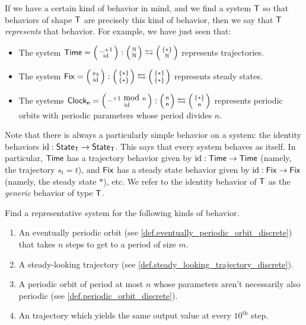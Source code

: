 \documentclass[DynamicalBook]{subfiles}
\begin{document}
If we have a certain kind of behavior in mind, and we find a system $\mathsf{T}$ so
that behaviors of shape $\mathsf{T}$ are precisely this kind of behavior, then we
say that $\mathsf{T}$ \emph{represents} that behavior. For example, we have just
seen that:
\begin{itemize}
  \item The system $\Sys{Time} = \lens{\_ + 1}{\id} : \lens{\nn}{\nn} \leftrightarrows
    \lens{\{\ast\}}{\nn}$ represents trajectories.
  \item The system $\Sys{Fix} = \lens{\pi_2}{\id} : \lens{\{\ast\}}{\{\ast\}}
    \leftrightarrows \lens{\{\ast\}}{\{\ast\}}$ represents steady states.
  \item The systems $\Sys{Clock_n} = \lens{\_ + { 1 \mbox{ mod } n }}{\id} :
    \lens{\ord{n}}{\ord{n}} \leftrightarrows \lens{\{\ast\}}{\ord{n}}$
    represents periodic orbits with periodic parameters whose period divides $n$.
\end{itemize}

Note that there is always a particularly simple behavior on a system: the
identity behaviors $\mathrm{id} : \mathsf{State}_{\mathsf{T}} \to \mathsf{State}_{\mathsf{T}}$. This says that every system
behaves as itself. In particular, $\mathsf{Time}$ has a trajectory behavior given by
$\mathrm{id} : \mathsf{Time} \to \mathsf{Time}$ (namely, the trajectory $s_t = t$), and $\mathsf{Fix}$ has a steady state behavior given by $\mathrm{id} : \mathsf{Fix} \to \mathsf{Fix}$ (namely,
the steady state $\ast$), etc. We refer to the identity behavior of $\mathsf{T}$ as the \emph{generic}
behavior of type $\mathsf{T}$.

\begin{exercise}\label{ex.find_representatives_discrete}
  Find a representative system for the following kinds of behavior.
  \begin{enumerate}
    \item An eventually periodic orbit (see \cref{def.eventually_periodic_orbit_discrete}) that takes $n$ steps to get to a period
      of size $m$.
    \item A steady-looking trajectory (see \cref{def.steady_looking_trajectory_discrete}).
    \item A periodic orbit of period at most $n$ whose parameters aren't
      necessarily also periodic (see \cref{def.periodic_orbit_discrete}).
    \item An trajectory which yields the same output value at every
      $10^{\text{th}}$ step.
     \qedhere
  \end{enumerate}
\end{exercise}
\end{document}
